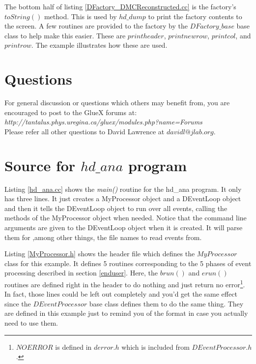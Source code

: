 \documentclass[12pt]{article}
\begin{document}



The bottom half of listing \ref{DFactory_DMCReconstructed.cc} is
the factory's $toString()$ method. This is used by $hd\_dump$
to print the factory contents to the screen. A few routines are
provided to the factory by the $DFactory\_base$ base class to
help make this easier. These are $printheader$, $printnewrow$,
$printcol$, and $printrow$. The example illustrates how these
are used.

\section{Questions}
For general discussion or questions which others may benefit from,
you are encouraged to post to the GlueX forums at:\\

{\it http://tantalus.phys.uregina.ca/gluex/modules.php?name=Forums}\\

Please refer all other questions to David Lawrence at $davidl@jlab.org$.

\newpage
\appendix
\section{Source for $hd\_ana$ program}
\label{hd_ana_src}

Listing \ref{hd_ana.cc} shows the {\it main()} routine for the
hd\_ana program. It only has three lines. It just creates a MyProcessor
object and a DEventLoop object and then it tells the DEventLoop object
to run over all events, calling the methods of the MyProcessor object
when needed. Notice that the command line arguments are given to 
the DEventLoop object when it is created. It will parse them for
,among other things, the file names to read events from.



\newpage
Listing \ref{MyProcessor.h} shows the header file which defines the
$MyProcessor$ class for this example. It defines 5 routines
corresponding to the 5
phases of event processing described in section \ref{enduser}. Here,
the $brun()$ and $erun()$ routines are defined right in the header
to do nothing and just return no error\footnote{$NOERROR$ is defined
in $derror.h$ which is included from $DEventProcessor.h$.}. 
In fact, those lines could be left out completely and you'd get the
same effect since the $DEventProcessor$ base class defines them
to do the same thing. They are defined in this example just to
remind you of the format in case you actually need to use them.\\
\end{document}
